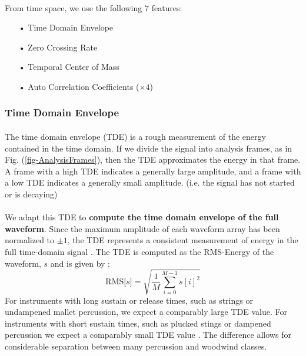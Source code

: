\documentclass[12pt,letterpaper]{article}
\begin{document}
\paragraph*{}From time space, we use the following $7$ features:
\begin{itemize}
\item[•] Time Domain Envelope
\item[•] Zero Crossing Rate
\item[•] Temporal Center of Mass
\item[•] Auto Correlation Coefficients ($\times 4$)
\end{itemize}


\newpage

\subsubsection{Time Domain Envelope}

\paragraph*{}The time domain envelope (TDE) is a rough measurement of the energy contained in the time domain. If we divide the signal into analysis frames, as in Fig. (\ref{fig-AnalysisFrames}), then the TDE approximates the energy in that frame. A frame with a high TDE indicates a generally large amplitude, and a frame with a low TDE indicates a generally small amplitude. (i.e. the signal has not started or is decaying)
 
\paragraph*{}We adapt this TDE to \textbf{compute the time domain envelope of the full waveform}. Since the maximum amplitude of each waveform array has been normalized to $\pm 1$, the TDE represents a consistent measurement of energy in the full time-domain signal \cite{Liu}. The TDE is computed as the RMS-Energy of the waveform, $s$ and is given by \cite{Olson,Serizel}:
\begin{equation}
\label{eqn-RMS}
\text{RMS}\big[ s \big] = \sqrt{\frac{1}{M} \sum_{i=0}^{M-1} s[i]^2}
\end{equation}
For instruments with long sustain or release times, such as strings or undampened mallet percussion, we expect a comparably large TDE value. For instruments with short sustain times, such as plucked stings or dampened percussion we expect a comparably small TDE value \cite{Olson,White}. The difference allows for considerable separation between many percussion and woodwind classes.
\end{document}
